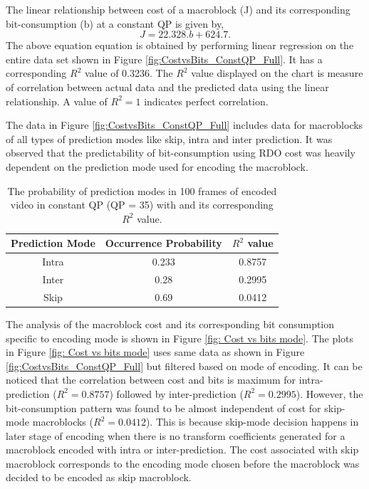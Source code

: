 \documentclass[11pt]{article} %
\begin{document}
The linear relationship between cost of a macroblock (J) and its corresponding bit-consumption (b) at a constant QP is given by,
\begin{equation}
	\label{Eq:costvsbits model all}
	J = 22.328 . b + 624.7.
\end{equation}
The above equation equation is obtained by performing linear regression on the entire data set shown in Figure \ref{fig:CostvsBits_ConstQP_Full}. It has a corresponding $R^2$ value of 0.3236. The $R^2$ value displayed on the chart is measure of correlation between actual data and the predicted data using the linear relationship. A value of $R^2 = 1$ indicates perfect correlation. 

The data in Figure \ref{fig:CostvsBits_ConstQP_Full} includes data for macroblocks of all types of prediction modes like skip, intra and inter prediction. It was observed that the predictability of bit-consumption using RDO cost was heavily dependent on the prediction mode used for encoding the macroblock. 

\begin{table} [h!]
	\centering
	\begin{tabular}{ |c|c|c| }
		\hline
		\textbf{Prediction Mode} & \textbf{Occurrence Probability } & \textbf{$R^2$ value} \\
		\hline 
		Intra & 0.233 & 0.8757  \\
		\hline
		Inter & 0.28 & 0.2995  \\
		\hline
		Skip &  0.69 & 0.0412 \\ 
		\hline					
	\end{tabular}
	\caption{The probability of prediction modes in 100 frames of encoded video in constant QP (QP = 35) with and its corresponding $R^2$ value.}
	\label{Table:Mode Specific data}
\end{table}


The analysis of the macroblock cost and its corresponding bit consumption specific to encoding mode is shown in Figure \ref{fig: Cost vs bits mode}. The plots in Figure \ref{fig: Cost vs bits mode} uses same data as shown in Figure \ref{fig:CostvsBits_ConstQP_Full} but filtered based on mode of encoding. It can be noticed that the correlation between cost and bits is maximum for intra-prediction ($R^2 = 0.8757$) followed by inter-prediction ($R^2 = 0.2995$). However, the bit-consumption pattern was found to be almost independent of cost for skip-mode macroblocks ($R^2 = 0.0412$). This is because skip-mode decision happens in later stage of encoding when there is no transform coefficients generated for a macroblock encoded with intra or inter-prediction. The cost associated with skip macroblock corresponds to the encoding mode chosen before the macroblock was decided to be encoded as skip macroblock.
\end{document}
